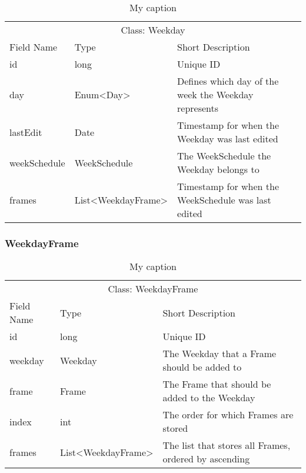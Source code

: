 \begin{table}[]
\centering
\caption{My caption}
\label{my-label1}
\begin{tabular}{lll}
\multicolumn{3}{c}{Class: Weekday}                                                                           \\
Field Name   & Type                                   & Short Description                                    \\
id           & long                                   & Unique ID                                            \\
day          & Enum\textless Day\textgreater          & Defines which day of the week the Weekday represents \\
lastEdit     & Date                                   & Timestamp for when the Weekday was last edited       \\
weekSchedule & WeekSchedule                           & The WeekSchedule the Weekday belongs to              \\
frames       & List\textless WeekdayFrame\textgreater & Timestamp for when the WeekSchedule was last edited 
\end{tabular}
\end{table}


\subsubsection{WeekdayFrame}

\begin{table}[]
\centering
\caption{My caption}
\label{my-label2}
\begin{tabular}{lll}
\multicolumn{3}{c}{Class: WeekdayFrame}                                                                    \\
Field Name & Type                                  & Short Description                                     \\
id         & long                                  & Unique ID                                             \\
weekday    & Weekday                               & The Weekday that a Frame should be added to           \\
frame      & Frame                                 & The Frame that should be added to the Weekday         \\
index      & int                                   & The order for which Frames are stored                 \\
frames     & List\textless WeekdayFrame\textgreater & The list that stores all Frames, ordered by ascending
\end{tabular}
\end{table}

